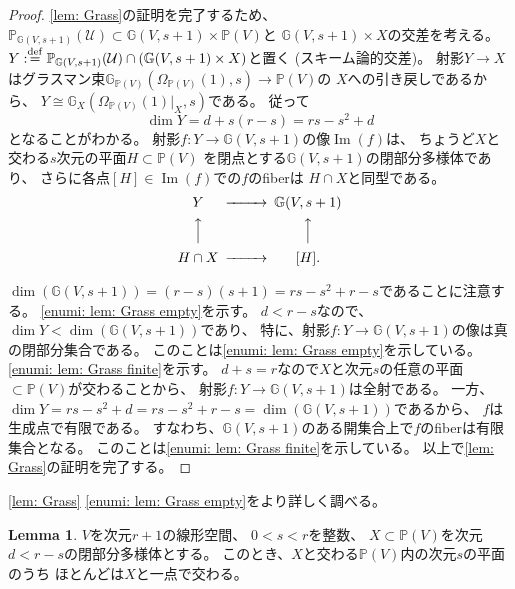 \documentclass[uplatex]{jsarticle}
\theoremstyle{definition}
\newtheorem{lem}[lem]{Lemma}
\DeclareMathOperator{\im}{\mathrm{Im}}
\newcommand{\G}{\mathbb{G}}
\renewcommand{\P}{\mathbb{P}}
\newcommand{\mcU}{\mathcal{U}}
\newcommand{\dfn}{:\overset{\mathrm{\scriptsize def}}{=}}
\newcommand{\lt}{<}
\begin{document}
\begin{proof}
  \autoref{lem: Grass}の証明を完了するため、
  \(\P_{\G(V,s+1)}(\mcU)\subset \G(V,s+1)\times \P(V)\)と
  \(\G(V,s+1)\times X\)の交差を考える。
  \(Y \dfn \P_{\G(V,s+1)}(\mcU) \cap (\G(V,s+1)\times X)\)と置く
  (スキーム論的交差)。
  射影\(Y\to X\)はグラスマン束\(\G_{\P(V)}(\Omega_{\P(V)}(1),s)\to \P(V)\)の
  \(X\)への引き戻しであるから、
  \(Y\cong \G_X(\Omega_{\P(V)}(1)|_X,s)\)である。
  従って
  \[\dim Y = d + s(r-s) = rs-s^2+d\]
  となることがわかる。
  射影\(f:Y\to \G(V,s+1)\)の像\(\im(f)\)は、
  ちょうど\(X\)と交わる\(s\)次元の平面\(H \subset \P(V)\)
  を閉点とする\(\G(V,s+1)\)の閉部分多様体であり、
  さらに各点\([H]\in \im (f)\)での\(f\)のfiberは
  \(H\cap X\)と同型である。
  \[
  \begin{CD}
    Y @>>> \G(V,s+1) \\
    @AAA @AAA \\
    H\cap X @>>> [H].
  \end{CD}
  \]

  \(\dim (\G(V,s+1)) = (r-s)(s+1) = rs-s^2+r-s\)であることに注意する。
  \ref{enumi: lem: Grass empty}を示す。
  \(d\lt r-s\)なので、
  \(\dim Y \lt \dim(\G(V,s+1))\)であり、
  特に、射影\(f:Y\to \G(V,s+1)\)の像は真の閉部分集合である。
  このことは\ref{enumi: lem: Grass empty}を示している。
  \ref{enumi: lem: Grass finite}を示す。
  \(d+s=r\)なので\(X\)と次元\(s\)の任意の平面\(\subset \P(V)\)が交わることから、
  射影\(f:Y\to \G(V,s+1)\)は全射である。
  一方、\(\dim Y = rs-s^2+d = rs-s^2+r-s = \dim(\G(V,s+1))\)であるから、
  \(f\)は生成点で有限である。
  すなわち、\(\G(V,s+1)\)のある開集合上で\(f\)のfiberは有限集合となる。
  このことは\ref{enumi: lem: Grass finite}を示している。
  以上で\autoref{lem: Grass}の証明を完了する。
\end{proof}


\autoref{lem: Grass} \ref{enumi: lem: Grass empty}をより詳しく調べる。

\begin{lem}\label{lem: Grass 1pt}
  \(V\)を次元\(r+1\)の線形空間、
  \(0 \lt s \lt r\)を整数、
  \(X\subset \P(V)\)を次元\(d \lt r-s\)の閉部分多様体とする。
  このとき、\(X\)と交わる\(\P(V)\)内の次元\(s\)の平面のうち
  ほとんどは\(X\)と一点で交わる。
\end{lem}
\end{document}

